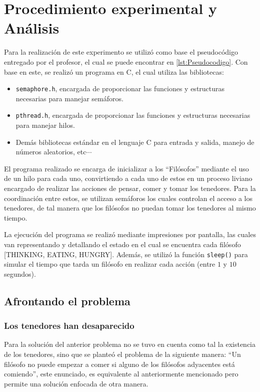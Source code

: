 \section{Procedimiento experimental y Análisis }\label{sec:ProcedimientoExperimental}
Para la realización de este experimento se utilizó como base el pseudocódigo entregado por el profesor, el cual se puede encontrar en \ref{lst:Pseudocodigo}. Con base en este, se realizó un programa en C, el cual utiliza las bibliotecas:
\begin{itemize}
    \item \texttt{semaphore.h}, encargada de proporcionar las funciones y estructuras necesarias para manejar semáforos.
    \item \texttt{pthread.h}, encargada de proporcionar las funciones y estructuras necesarias para manejar hilos.
    \item Demás bibliotecas estándar en el lenguaje C para entrada y salida, manejo de números aleatorios, etc$\cdots$
\end{itemize}

El programa realizado se encarga de inicializar a los ``Filósofos'' mediante el uso de un hilo para cada uno, convirtiendo a cada uno de estos en un proceso liviano encargado de realizar las acciones de pensar, comer y tomar los tenedores. Para la coordinación entre estos, se utilizan semáforos los cuales controlan el acceso a los tenedores, de tal manera que los filósofos no puedan tomar los tenedores al mismo tiempo.

La ejecución del programa se realizó mediante impresiones por pantalla, las cuales van representando y detallando el estado en el cual se encuentra cada filósofo [THINKING, EATING, HUNGRY]. Además, se utilizó la función \texttt{sleep()} para simular el tiempo que tarda un filósofo en realizar cada acción (entre $1$ y $10$ segundos).

\subsection{Afrontando el problema}
\subsubsection*{Los tenedores han desaparecido}
Para la solución del anterior problema no se tuvo en cuenta como tal la existencia de los tenedores, sino que se planteó el problema de la siguiente manera: ``Un filósofo no puede empezar a comer si alguno de los filósofos adyacentes está comiendo'', este enunciado, es equivalente al anteriormente mencionado pero permite una solución enfocada de otra manera.

